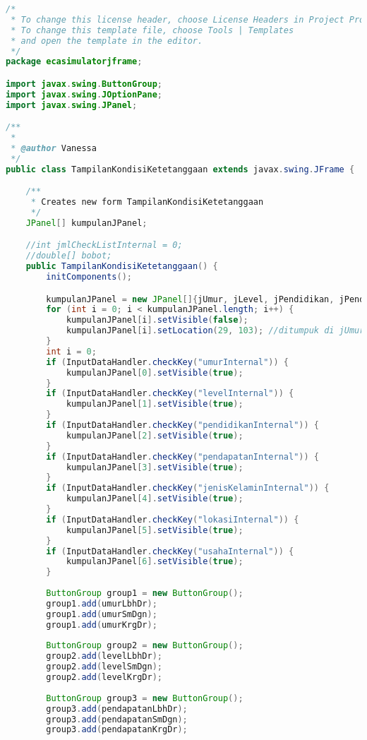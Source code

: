 \begin{lstlisting}[language=Java, caption=TampilanKondisiKetetanggaan.java]
/*
 * To change this license header, choose License Headers in Project Properties.
 * To change this template file, choose Tools | Templates
 * and open the template in the editor.
 */
package ecasimulatorjframe;

import javax.swing.ButtonGroup;
import javax.swing.JOptionPane;
import javax.swing.JPanel;

/**
 *
 * @author Vanessa
 */
public class TampilanKondisiKetetanggaan extends javax.swing.JFrame {

    /**
     * Creates new form TampilanKondisiKetetanggaan
     */
    JPanel[] kumpulanJPanel;

    //int jmlCheckListInternal = 0;
    //double[] bobot;
    public TampilanKondisiKetetanggaan() {
        initComponents();

        kumpulanJPanel = new JPanel[]{jUmur, jLevel, jPendidikan, jPendapatan, jJenisKelamin, jLokasi, jbidangUsaha};
        for (int i = 0; i < kumpulanJPanel.length; i++) {
            kumpulanJPanel[i].setVisible(false);
            kumpulanJPanel[i].setLocation(29, 103); //ditumpuk di jUmur
        }
        int i = 0;
        if (InputDataHandler.checkKey("umurInternal")) {
            kumpulanJPanel[0].setVisible(true);
        }
        if (InputDataHandler.checkKey("levelInternal")) {
            kumpulanJPanel[1].setVisible(true);
        }
        if (InputDataHandler.checkKey("pendidikanInternal")) {
            kumpulanJPanel[2].setVisible(true);
        }
        if (InputDataHandler.checkKey("pendapatanInternal")) {
            kumpulanJPanel[3].setVisible(true);
        }
        if (InputDataHandler.checkKey("jenisKelaminInternal")) {
            kumpulanJPanel[4].setVisible(true);
        }
        if (InputDataHandler.checkKey("lokasiInternal")) {
            kumpulanJPanel[5].setVisible(true);
        }
        if (InputDataHandler.checkKey("usahaInternal")) {
            kumpulanJPanel[6].setVisible(true);
        }
        
        ButtonGroup group1 = new ButtonGroup();
        group1.add(umurLbhDr);
        group1.add(umurSmDgn);
        group1.add(umurKrgDr);
        
        ButtonGroup group2 = new ButtonGroup();
        group2.add(levelLbhDr);
        group2.add(levelSmDgn);
        group2.add(levelKrgDr);
        
        ButtonGroup group3 = new ButtonGroup();
        group3.add(pendapatanLbhDr);
        group3.add(pendapatanSmDgn);
        group3.add(pendapatanKrgDr);
        

\end{lstlisting}
